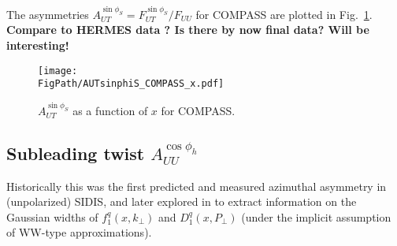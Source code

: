 \documentclass[a4paper,11pt]{article}
\newcommand{\blue}[1]{{\color{blue} #1}}
\newcommand{\PS}[1]{\blue{\bf\boldmath #1}}
\def\kperp{k_\perp}
\def\pperp{P_\perp}
\newcommand*{\FigPath}{./figs}%
\begin{document}
The asymmetries $A_{UT}^{\sin\phi_S}=F_{UT}^{\sin\phi_S}/F_{UU}$  for 
COMPASS are plotted in Fig.~\ref{autsinphi_jlab}.
\PS{Compare to HERMES data \cite{Schnell:2010zza}?
Is there by now final data? Will be interesting!}


\begin{figure}[ht]
\centering
\texttt{[image: \\FigPath/AUTsinphiS\_COMPASS\_x.pdf]} 
\caption{\label{autsinphi_jlab} $A_{UT}^{\sin\phi_S}$  as a function of $ x $ for COMPASS.
}
\end{figure}

 

\newpage
\subsection{\boldmath Subleading twist  $A_{UU}^{\cos\phi_h}$ }
\label{Sec-7.7:FUUcosphi}

Historically this was the first predicted \cite{Cahn:1978se} and measured
\cite{Aubert:1983cz} azimuthal asymmetry in (unpolarized) SIDIS, and
later explored in \cite{Anselmino:2005nn} to extract information on the 
Gaussian widths of $f_1^q(x,\kperp)$ and $D_1^q(x,\pperp)$ (under the 
implicit assumption of WW-type approximations).
\end{document}
